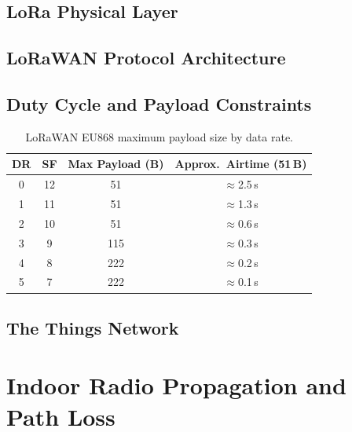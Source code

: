 \documentclass[12pt, a4paper, twoside, openright]{report}
\begin{document}
\subsection{LoRa Physical Layer}

\subsection{LoRaWAN Protocol Architecture}

\subsection{Duty Cycle and Payload Constraints}
\begin{table}[H]
  \centering
  \begin{tabular}{cccc}
    \toprule
    \textbf{DR} & \textbf{SF} & \textbf{Max Payload (B)} & \textbf{Approx.\ Airtime (51\,B)} \\
    \midrule
    0 & 12 & 51  & $\approx$2.5\,s \\
    1 & 11 & 51  & $\approx$1.3\,s \\
    2 & 10 & 51  & $\approx$0.6\,s \\
    3 & 9  & 115 & $\approx$0.3\,s \\
    4 & 8  & 222 & $\approx$0.2\,s \\
    5 & 7  & 222 & $\approx$0.1\,s \\
    \bottomrule
  \end{tabular}
  \caption{LoRaWAN EU868 maximum payload size by data rate.}
  \label{tab:lorawan-payload}
\end{table}

\subsection{The Things Network}

\section{Indoor Radio Propagation and Path Loss}
\label{sec:path-loss-theory}
\end{document}
